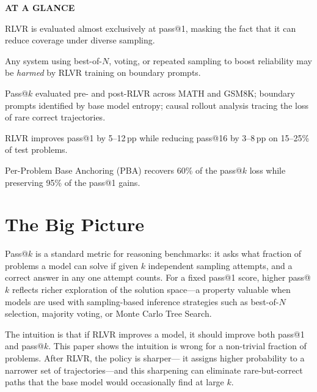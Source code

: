 \documentclass[10pt,twocolumn]{article}
\begin{document}
\begin{mdframed}[backgroundcolor=boxgray,linecolor=rulered,linewidth=1pt,
    innerleftmargin=6pt,innerrightmargin=6pt,
    innertopmargin=6pt,innerbottommargin=6pt]
\textbf{\small AT A GLANCE}\par\vspace{4pt}
\begin{description}[leftmargin=0pt,labelsep=4pt,itemsep=2pt,parsep=0pt,
    font=\small\bfseries]
  \item[Problem:] RLVR is evaluated almost exclusively at pass@1,
    masking the fact that it can reduce coverage under diverse sampling.
  \item[Why it matters:] Any system using best-of-$N$, voting, or
    repeated sampling to boost reliability may be \emph{harmed} by
    RLVR training on boundary prompts.
  \item[Method:] Pass@$k$ evaluated pre- and post-RLVR across MATH
    and GSM8K; boundary prompts identified by base model entropy;
    causal rollout analysis tracing the loss of rare correct trajectories.
  \item[Result:] RLVR improves pass@1 by 5--12\,pp while reducing
    pass@16 by 3--8\,pp on 15--25\% of test problems.
  \item[Evidence:] Per-Problem Base Anchoring (PBA) recovers 60\%
    of the pass@$k$ loss while preserving 95\% of the pass@1 gains.
\end{description}
\end{mdframed}

\section{The Big Picture}

Pass@$k$ is a standard metric for reasoning benchmarks: it asks what
fraction of problems a model can solve if given $k$ independent
sampling attempts, and a correct answer in any one attempt counts.
For a fixed pass@1 score, higher pass@$k$ reflects richer exploration
of the solution space---a property valuable when models are used
with sampling-based inference strategies such as best-of-$N$ selection,
majority voting, or Monte Carlo Tree Search.

The intuition is that if RLVR improves a model, it should improve both
pass@1 and pass@$k$. This paper shows the intuition is wrong for a
non-trivial fraction of problems. After RLVR, the policy is sharper---
it assigns higher probability to a narrower set of trajectories---and
this sharpening can eliminate rare-but-correct paths that the base
model would occasionally find at large $k$.
\end{document}
